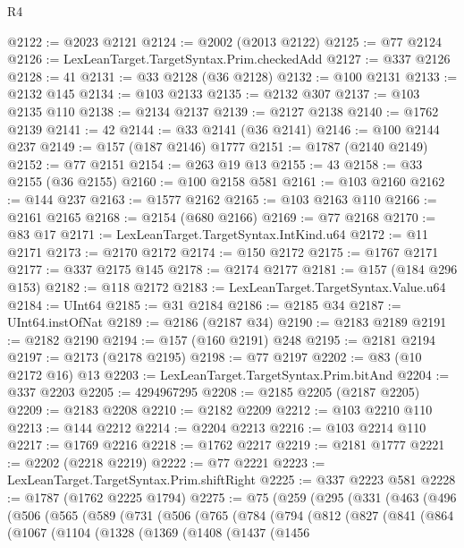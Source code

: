 \begin{lexlean}{R4}
\begin{coremodule}
@2122 := @2023 @2121
@2124 := @2002 (@2013 @2122)
@2125 := @77 @2124
@2126 := LexLeanTarget.TargetSyntax.Prim.checkedAdd
@2127 := @337 @2126
@2128 := 41
@2131 := @33 @2128 (@36 @2128)
@2132 := @100 @2131
@2133 := @2132 @145
@2134 := @103 @2133
@2135 := @2132 @307
@2137 := @103 @2135 @110
@2138 := @2134 @2137
@2139 := @2127 @2138
@2140 := @1762 @2139
@2141 := 42
@2144 := @33 @2141 (@36 @2141)
@2146 := @100 @2144 @237
@2149 := @157 (@187 @2146) @1777
@2151 := @1787 (@2140 @2149)
@2152 := @77 @2151
@2154 := @263 @19 @13
@2155 := 43
@2158 := @33 @2155 (@36 @2155)
@2160 := @100 @2158 @581
@2161 := @103 @2160
@2162 := @144 @237
@2163 := @1577 @2162
@2165 := @103 @2163 @110
@2166 := @2161 @2165
@2168 := @2154 (@680 @2166)
@2169 := @77 @2168
@2170 := @83 @17
@2171 := LexLeanTarget.TargetSyntax.IntKind.u64
@2172 := @11 @2171
@2173 := @2170 @2172
@2174 := @150 @2172
@2175 := @1767 @2171
@2177 := @337 @2175 @145
@2178 := @2174 @2177
@2181 := @157 (@184 @296 @153)
@2182 := @118 @2172
@2183 := LexLeanTarget.TargetSyntax.Value.u64
@2184 := UInt64
@2185 := @31 @2184
@2186 := @2185 @34
@2187 := UInt64.instOfNat
@2189 := @2186 (@2187 @34)
@2190 := @2183 @2189
@2191 := @2182 @2190
@2194 := @157 (@160 @2191) @248
@2195 := @2181 @2194
@2197 := @2173 (@2178 @2195)
@2198 := @77 @2197
@2202 := @83 (@10 @2172 @16) @13
@2203 := LexLeanTarget.TargetSyntax.Prim.bitAnd
@2204 := @337 @2203
@2205 := 4294967295
@2208 := @2185 @2205 (@2187 @2205)
@2209 := @2183 @2208
@2210 := @2182 @2209
@2212 := @103 @2210 @110
@2213 := @144 @2212
@2214 := @2204 @2213
@2216 := @103 @2214 @110
@2217 := @1769 @2216
@2218 := @1762 @2217
@2219 := @2181 @1777
@2221 := @2202 (@2218 @2219)
@2222 := @77 @2221
@2223 := LexLeanTarget.TargetSyntax.Prim.shiftRight
@2225 := @337 @2223 @581
@2228 := @1787 (@1762 @2225 @1794)
@2275 := @75
    (@259
      (@295
        (@331
          (@463
            (@496
              (@506
                (@565
                  (@589
                    (@731
                      (@506
                        (@765
                          (@784
                            (@794
                              (@812
                                (@827
                                  (@841
                                    (@864
                                      (@1067
                                        (@1104
                                          (@1328
                                            (@1369
                                              (@1408
                                                (@1437
                                                  (@1456

\end{coremodule}
\end{lexlean}
